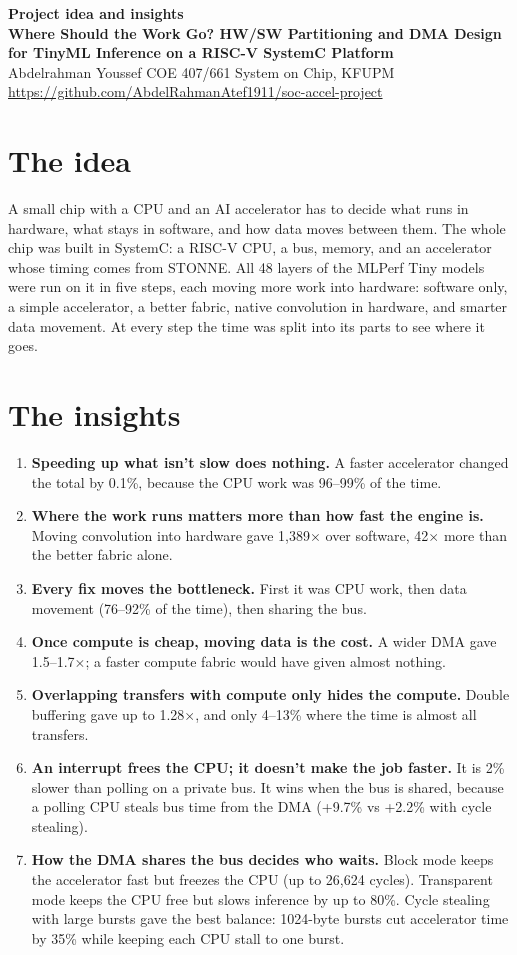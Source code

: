 \documentclass[11pt,a4paper]{article}
\begin{document}
{\Large\bfseries\color{acc} Project idea and insights}\\[4pt]
\textbf{Where Should the Work Go? HW/SW Partitioning and DMA Design for TinyML Inference on a RISC-V SystemC Platform}\\
Abdelrahman Youssef \textperiodcentered{} COE 407/661 System on Chip, KFUPM \textperiodcentered{} \url{https://github.com/AbdelRahmanAtef1911/soc-accel-project}

\section*{\color{acc}The idea}
A small chip with a CPU and an AI accelerator has to decide what runs in hardware, what stays in software, and how data moves between them. The whole chip was built in SystemC: a RISC-V CPU, a bus, memory, and an accelerator whose timing comes from STONNE. All 48 layers of the MLPerf Tiny models were run on it in five steps, each moving more work into hardware: software only, a simple accelerator, a better fabric, native convolution in hardware, and smarter data movement. At every step the time was split into its parts to see where it goes.

\section*{\color{acc}The insights}
\begin{enumerate}[leftmargin=1.5em, itemsep=4pt]
\item \textbf{Speeding up what isn't slow does nothing.} A faster accelerator changed the total by 0.1\%, because the CPU work was 96--99\% of the time.
\item \textbf{Where the work runs matters more than how fast the engine is.} Moving convolution into hardware gave 1{,}389$\times$ over software, 42$\times$ more than the better fabric alone.
\item \textbf{Every fix moves the bottleneck.} First it was CPU work, then data movement (76--92\% of the time), then sharing the bus.
\item \textbf{Once compute is cheap, moving data is the cost.} A wider DMA gave 1.5--1.7$\times$; a faster compute fabric would have given almost nothing.
\item \textbf{Overlapping transfers with compute only hides the compute.} Double buffering gave up to 1.28$\times$, and only 4--13\% where the time is almost all transfers.
\item \textbf{An interrupt frees the CPU; it doesn't make the job faster.} It is 2\% slower than polling on a private bus. It wins when the bus is shared, because a polling CPU steals bus time from the DMA (+9.7\% vs +2.2\% with cycle stealing).
\item \textbf{How the DMA shares the bus decides who waits.} Block mode keeps the accelerator fast but freezes the CPU (up to 26{,}624 cycles). Transparent mode keeps the CPU free but slows inference by up to 80\%. Cycle stealing with large bursts gave the best balance: 1024-byte bursts cut accelerator time by 35\% while keeping each CPU stall to one burst.
\end{enumerate}
\end{document}
